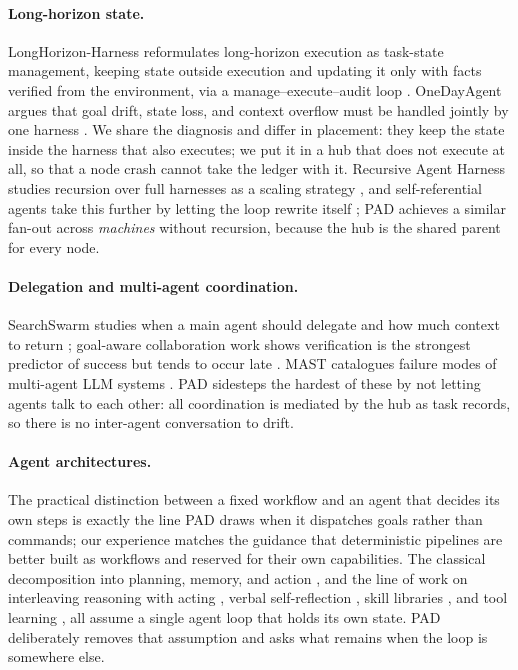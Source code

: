 \documentclass{article}
\begin{document}
\paragraph{Long-horizon state.} LongHorizon-Harness reformulates long-horizon
execution as task-state management, keeping state outside execution and updating it
only with facts verified from the environment, via a manage--execute--audit loop
\cite{longhorizon2026}. OneDayAgent argues that goal drift, state loss, and context
overflow must be handled jointly by one harness \cite{onedayagent2026}. We share the
diagnosis and differ in placement: they keep the state inside the harness that also
executes; we put it in a hub that does not execute at all, so that a node crash
cannot take the ledger with it. Recursive Agent Harness studies recursion over full
harnesses as a scaling strategy \cite{raharness2026}, and self-referential agents
take this further by letting the loop rewrite itself \cite{godel2024}; PAD achieves
a similar fan-out across \emph{machines} without recursion, because the hub is the
shared parent for every node.

\paragraph{Delegation and multi-agent coordination.} SearchSwarm studies when a main
agent should delegate and how much context to return \cite{searchswarm2026};
goal-aware collaboration work shows verification is the strongest predictor of
success but tends to occur late \cite{goalaware2026}. MAST catalogues failure modes
of multi-agent LLM systems \cite{whyfail2025}. PAD sidesteps the hardest of these by
not letting agents talk to each other: all coordination is mediated by the hub as
task records, so there is no inter-agent conversation to drift.

\paragraph{Agent architectures.} The practical distinction between a fixed
workflow and an agent that decides its own steps \cite{anthropic2024agents} is
exactly the line PAD draws when it dispatches goals rather than commands; our
experience matches the guidance that deterministic pipelines are better built as
workflows and reserved for their own capabilities. The classical decomposition into
planning, memory, and action \cite{cogarch2023,agentsurvey2023}, and the line of work on
interleaving reasoning with acting \cite{react2023}, verbal self-reflection
\cite{reflexion2023}, skill libraries \cite{voyager2023}, and tool learning
\cite{toolformer2023}, all assume a single agent loop that holds its own state.
PAD deliberately removes that assumption and asks what remains when the loop is
somewhere else.
\end{document}
